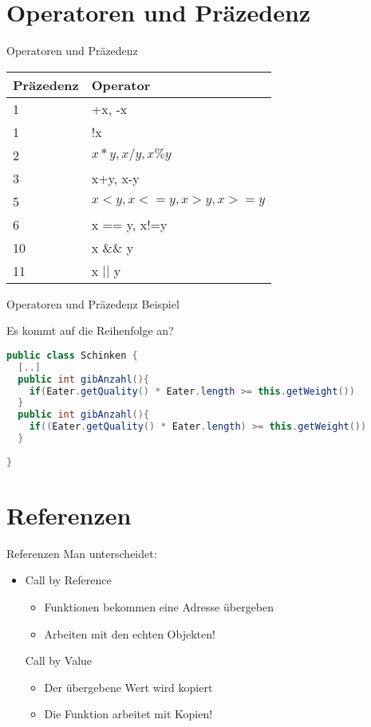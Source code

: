\documentclass[18pt]{beamer}
\begin{document}
\section{Operatoren und Präzedenz}
\begin{frame}{Operatoren und Präzedenz}
 \begin{tabular}{|l|l|}
 \hline
  Präzedenz  & Operator \\
  \hline
  1 & +x, -x \\
  1 & !x \\
  2 & $x*y, x/y, x\%y $\\
  3 & x+y, x-y \\
  5 & $x<y, x <= y, x>y, x >= y$ \\
  6 & x == y, x!=y \\
  10 & x \&\& y \\
  11 & x $||$ y \\
   \hline
 \end{tabular}
\end{frame}


\begin{frame}[fragile]{Operatoren und Präzedenz Beispiel}
\begin{exampleblock}{Es kommt auf die Reihenfolge an?}
\begin{lstlisting}[language=java]
public class Schinken {
  [..]
  public int gibAnzahl(){
    if(Eater.getQuality() * Eater.length >= this.getWeight())
  }
  public int gibAnzahl(){
    if((Eater.getQuality() * Eater.length) >= this.getWeight())
  }
  
}
\end{lstlisting}
\end{exampleblock}
\end{frame}


\section{Referenzen}
\begin{frame}{Referenzen}
Man unterscheidet: \pause
\begin{itemize}
 \item Call by Reference 
  \begin{itemize}
    \item Funktionen bekommen eine Adresse übergeben
    \item Arbeiten mit den echten Objekten!
  \end{itemize}
  Call by Value
  \begin{itemize}
   \item Der übergebene Wert wird kopiert
   \item Die Funktion arbeitet mit Kopien!
  \end{itemize}

\end{itemize}
\end{frame}
\end{document}
